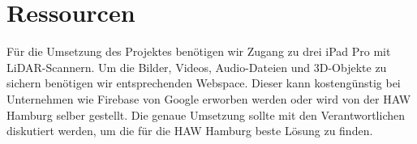 \documentclass[pdftex,10pt,a4paper,oneside]{article}
\numberwithin{equation}{section} %
\begin{document}
\section{Ressourcen}
Für die Umsetzung des Projektes benötigen wir Zugang zu drei iPad Pro mit LiDAR-Scannern. Um die Bilder, Videos, Audio-Dateien und 3D-Objekte zu sichern benötigen wir entsprechenden Webspace. Dieser kann kostengünstig bei Unternehmen wie Firebase von Google erworben werden oder wird von der HAW Hamburg selber gestellt. Die genaue Umsetzung sollte mit den Verantwortlichen diskutiert werden, um die für die HAW Hamburg beste Lösung zu finden.
\end{document}
